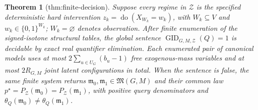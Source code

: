 \documentclass{article}
\newtheorem{theorem}{Theorem}
\begin{document}
\begin{theorem}[thm:finite-decision]\label{thm:finite-decision}
Suppose every regime in \(\mathcal Z\) is the specified deterministic hard intervention \(z_k=\operatorname{do}(X_{W_k}=w_k)\), with \(W_k\subseteq V\) and \(w_k\in\{0,1\}^{W_k}\); \(W_k=\varnothing\) denotes observation. After finite enumeration of the signed-isotone structural tables, the global sentence \(\operatorname{GID}_{G,M,\mathcal Z}(Q)=1\) is decidable by exact real quantifier elimination. Each enumerated pair of canonical models uses at most \(2\sum_{u\in U_G}(b_u-1)\) free exogenous-mass variables and at most \(2R_{G,M}\) joint latent configurations in total. When the sentence is false, the same finite system returns \(\mathfrak m_0,\mathfrak m_1\in\mathfrak M(G,M)\) and their common law \(p^{\star}=P_{\mathcal Z}(\mathfrak m_0)=P_{\mathcal Z}(\mathfrak m_1)\), with positive query denominators and \(\theta_Q(\mathfrak m_0)\ne\theta_Q(\mathfrak m_1)\).
\end{theorem}
\end{document}
